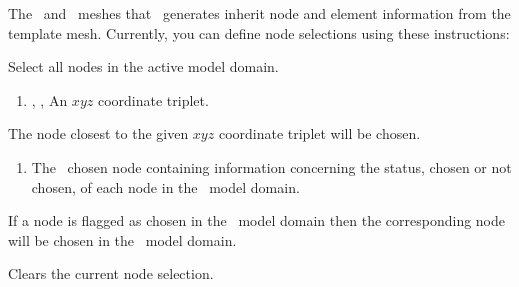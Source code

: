 The \swf\ and \gwf\ meshes that \mut\ generates inherit node and element information from the template mesh.  Currently, you can define node selections using these instructions: \label{page:nodeSelect}

    {Select all nodes in the active model domain.
     }

    {
        \squish
        \begin{enumerate}
        \item {}, ,   An $xyz$ coordinate triplet.
        \end{enumerate}
        The node closest to the given $xyz$ coordinate triplet will be chosen.
    }

    {
        \squish
        \begin{enumerate}
        \item {}  The \gb\ chosen node  containing information concerning the status, chosen or not chosen, of each node in the \gb\ model domain.
        \end{enumerate}
          If a node is flagged as chosen in the \gb\ model domain then the corresponding node will be chosen in the \mfus\ model domain.
    }

    {Clears the current node selection.
     }
 

  